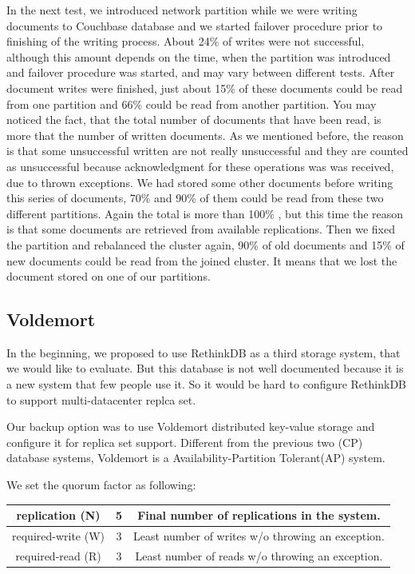 \documentclass[a4paper]{article}
\begin{document}
In the next test, we introduced network partition while we were writing documents to Couchbase database and we started failover procedure prior to finishing of the writing process. 
About 24\% of writes were not successful, although this amount depends on the time, when the partition was introduced and failover procedure was started, and may vary between different tests.
After document writes were finished, just about 15\% of these documents could be read from one partition and 66\% could be read from another partition.
You may noticed the fact, that the total number of documents that have been read, is more that the number of written documents.
As we mentioned before, the reason is that some unsuccessful written are not really unsuccessful and they are counted as unsuccessful because acknowledgment for these operations was was received, due to thrown exceptions. 
We had stored some other documents before writing this series of documents, 70\% and 90\% of them could be read from these two different partitions.
Again the total is more than 100\% , but this time the reason is that some documents are retrieved from available replications. 
Then we fixed the partition and rebalanced the cluster again, 90\% of old documents and 15\% of new documents could be read from the joined cluster.
It means that we lost the document stored on one of our partitions.

\subsection{Voldemort}

In the beginning, we proposed to use RethinkDB as a third storage system, that we would like to evaluate. But this database is not well documented because it is a new system that few people use it. So it would be hard to configure RethinkDB to support multi-datacenter replca set.

Our backup option was to use Voldemort distributed key-value storage and configure it for replica set support. Different from the previous two (CP) database systems, Voldemort is a Availability-Partition Tolerant(AP) system. 

We set the quorum factor as following:

\begin{table}[hb]
  \centering
  \begin{tabular}{|c|c|c|}
    \hline
    replication (N) & 5 & Final number of replications in the system. \\
    \hline
    required-write (W) & 3 & Least number of writes w/o throwing an exception. \\
    \hline
    required-read (R) & 3 & Least number of reads w/o throwing an exception. \\
    \hline
  \end{tabular}
\end{table}
\end{document}
